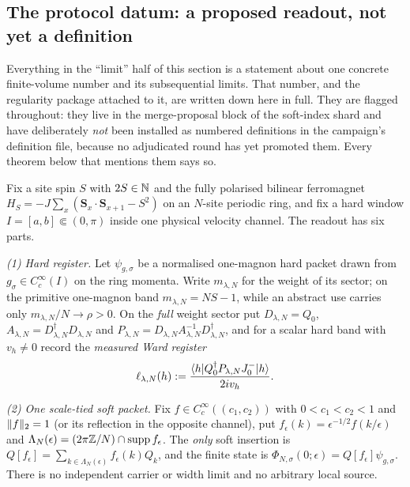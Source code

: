 \subsection{The protocol datum: a proposed readout, not yet a definition}

Everything in the ``limit'' half of this section is a statement about one
concrete finite-volume number and its subsequential limits. That number, and
the regularity package attached to it, are written down here in full. They are
flagged \statusProposed{} throughout: they live in the merge-proposal block of
the soft-index shard and have deliberately \emph{not} been installed as
numbered definitions in the campaign's definition file, because no adjudicated
round has yet promoted them. Every theorem below that mentions them says so.

\begin{definition}
\label{def:protocol-readout}
\statusProposed

Fix a site spin $S$ with $2S\in\mathbb{N}$ and the fully polarised bilinear
ferromagnet $H_S=-J\sum_x(\mathbf S_x\cdot\mathbf S_{x+1}-S^2)$ on an
$N$-site periodic ring, and fix a hard window $I=[a,b]\Subset(0,\pi)$ inside
one physical velocity channel. The readout has six parts.

\emph{(1) Hard register.} Let $\psi_{g,\sigma}$ be a normalised one-magnon
hard packet drawn from $g_\sigma\in C_c^\infty(I)$ on the ring momenta. Write
$m_{\lambda,N}$ for the weight of its sector; on the primitive one-magnon band
$m_{\lambda,N}=NS-1$, while an abstract use carries only
$m_{\lambda,N}/N\to\rho>0$. On the \emph{full} weight sector put
$D_{\lambda,N}=Q_0$, $A_{\lambda,N}=D_{\lambda,N}^\dagger D_{\lambda,N}$ and
$P_{\lambda,N}=D_{\lambda,N}A_{\lambda,N}^{-1}D_{\lambda,N}^\dagger$, and for a
scalar hard band with $v_h\neq0$ record the \emph{measured Ward register}
\begin{equation}
  \ell_{\lambda,N}(h):=
  \frac{\langle h|Q_0^\dagger P_{\lambda,N}J^-_0|h\rangle}{2iv_h}.
  \label{eq:measured-ward-register}
\end{equation}

\emph{(2) One scale-tied soft packet.} Fix $f\in C_c^\infty((c_1,c_2))$ with
$0<c_1<c_2<1$ and $\lVert f\rVert_2=1$ (or its reflection in the opposite channel),
put $f_\epsilon(k)=\epsilon^{-1/2}f(k/\epsilon)$ and
$\Lambda_N(\epsilon)=(2\pi\mathbb{Z}/N)\cap\operatorname{supp} f_\epsilon$. The \emph{only} soft
insertion is $Q[f_\epsilon]=\sum_{k\in\Lambda_N(\epsilon)}f_\epsilon(k)Q_k$,
and the finite state is
$\Phi_{N,\sigma}(0;\epsilon)=Q[f_\epsilon]\psi_{g,\sigma}$. There is no
independent carrier or width limit and no arbitrary local source.


\end{definition}
